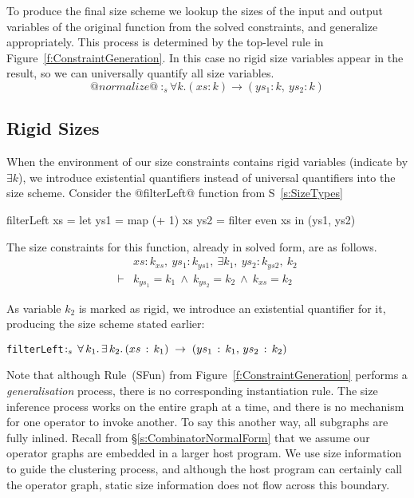 To produce the final size scheme we lookup the sizes of the input and output variables of the original function from the solved constraints, and generalize appropriately. This process is determined by the top-level rule in Figure~\ref{f:ConstraintGeneration}. In this case no rigid size variables appear in the result, so we can universally quantify all size variables.
$$@normalize@ ~:_s \forall k. (xs : k) \to (ys_1 : k,~ ys_2 : k)
$$




\subsection{Rigid Sizes}
When the environment of our size constraints contains rigid variables (indicate by $\exists k$), we introduce existential quantifiers instead of universal quantifiers into the size scheme. Consider the @filterLeft@ function from S~\ref{s:SizeTypes}
\begin{code}
      filterLeft xs
        = let ys1 = map (+ 1)   xs
              ys2 = filter even xs
          in (ys1, ys2)
\end{code}
The size constraints for this function, already in solved form, are as follows.
$$
\begin{array}{ll}
       & xs : k_{xs},~ ys_1 : k_{ys1},~ \exists k_1,~ ys_2 : k_{ys2},~ k_2
\\
\vdash &          k_{ys_1} = k_1
        ~\wedge~  k_{ys_2} = k_2
        ~\wedge~  k_{xs}   = k_2
\end{array}
$$

As variable $k_2$ is marked as rigid, we introduce an existential quantifier for it, producing the size scheme stated earlier:

\begin{alltt}
   filterLeft \(:\sb{s}\,\forall\,k\sb{1}.\,\exists\,k\sb{2}.\,(xs\,:\,k\sb{1})\;\to\;(ys\sb{1}\,:\,k\sb{1},\,ys\sb{2}\,:\,k\sb{2})\)
\end{alltt}

Note that although Rule~(SFun) from Figure~\ref{f:ConstraintGeneration} performs a \emph{generalisation} process, there is no corresponding instantiation rule. The size inference process works on the entire graph at a time, and there is no mechanism for one operator to invoke another. To say this another way, all subgraphs are fully inlined. Recall from \S\ref{s:CombinatorNormalForm} that we assume our operator graphs are embedded in a larger host program. We use size information to guide the clustering process, and although the host program can certainly call the operator graph, static size information does not flow across this boundary.

